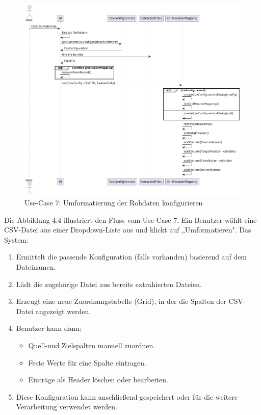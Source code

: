 \documentclass[a4paper,12pt]{scrreprt}
\begin{document}
\begin{figure}[H]
	\includegraphics[width=18.5cm]{CsvKonfiguration.png}
	\caption{\label{} Use-Case 7: Umformatierung der Rohdaten konfigurieren}
\end{figure}
Die Abbildung 4.4 illustriert den Fluss vom Use-Case 7. Ein Benutzer wählt eine CSV-Datei aus einer Dropdown-Liste aus und klickt auf „Umformatieren". Das System:
\begin{enumerate}
	\item Ermittelt die passende Konfiguration (falls vorhanden) basierend auf dem Dateinamen.
	\item Lädt die zugehörige Datei aus bereits extrahierten Dateien.
	\item Erzeugt eine neue Zuordnungstabelle (Grid), in der die Spalten der CSV-Datei angezeigt werden.
	\item Benutzer kann dann:
		\begin{itemize}
			\item Quell-und Zielspalten manuell zuordnen.
			\item Feste Werte für eine Spalte eintragen.
			\item Einträge als Header löschen oder bearbeiten.
		\end{itemize}
	\item Diese Konfiguration kann anschließend gespeichert oder für die weitere Verarbeitung verwendet werden.
\end{enumerate}
\end{document}
